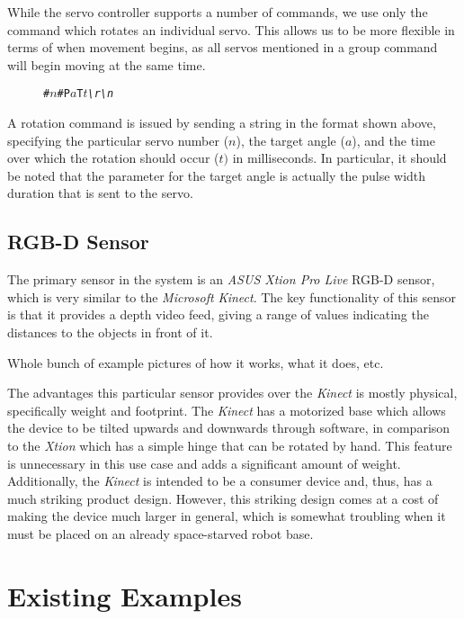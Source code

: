 While the servo controller supports a number of commands, we use only the command which rotates an individual servo. This allows us to be more flexible in terms of when movement begins, as all servos mentioned in a group command will begin moving at the same time.

\begin{figure}[!h]
    \centering
    \texttt{\#\(n\)\#P\(a\)T\(t\)\emph{\textbackslash r\textbackslash n}}
\end{figure}

A rotation command is issued by sending a string in the format shown above, specifying the particular servo number (\(n\)), the target angle (\(a\)), and the time over which the rotation should occur (\(t)\) in milliseconds. In particular, it should be noted that the parameter for the target angle is actually the pulse width duration that is sent to the servo.

\subsection{RGB-D Sensor}
The primary sensor in the system is an \emph{ASUS Xtion Pro Live} RGB-D sensor, which is very similar to the \emph{Microsoft Kinect}. The key functionality of this sensor is that it provides a depth video feed, giving a range of values indicating the distances to the objects in front of it.

Whole bunch of example pictures of how it works, what it does, etc.

The advantages this particular sensor provides over the \emph{Kinect} is mostly physical, specifically weight and footprint. The \emph{Kinect} has a motorized base which allows the device to be tilted upwards and downwards through software, in comparison to the \emph{Xtion} which has a simple hinge that can be rotated by hand. This feature is unnecessary in this use case and adds a significant amount of weight. Additionally, the \emph{Kinect} is intended to be a consumer device and, thus, has a much striking product design. However, this striking design comes at a cost of making the device much larger in general, which is somewhat troubling when it must be placed on an already space-starved robot base.


\section{Existing Examples}